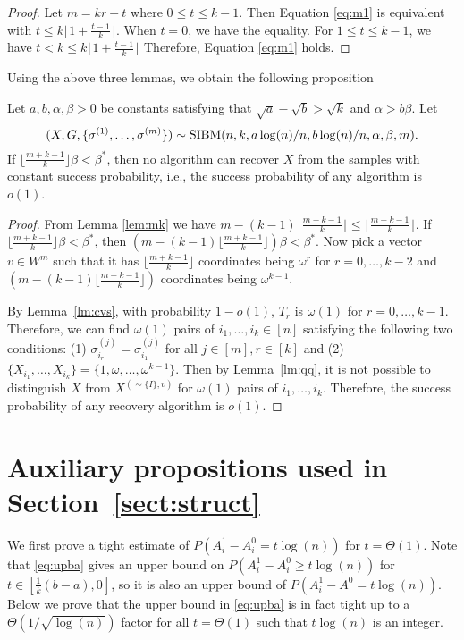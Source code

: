 \documentclass{article}
\begin{document}
\begin{proof}
   Let $m = kr + t$ where $0\leq t \leq k-1$.
   Then Equation \eqref{eq:m1} is equivalent with $ t \leq k\lfloor 1 +  \frac{t-1}{k} \rfloor $.
   When $ t = 0$, we have the equality. For $1\leq t \leq k-1$, we have $t < k \leq k\lfloor 1 +  \frac{t-1}{k} \rfloor$
   Therefore, Equation \eqref{eq:m1} holds.
\end{proof}
Using the above three lemmas, we obtain the following proposition
\begin{proposition}
	Let $a,b,\alpha,\beta> 0$ be constants satisfying that $\sqrt{a}-\sqrt{b} > \sqrt{k}$ and $\alpha>b\beta$. 
	Let 
	$$
	(X,G,\{\sigma^{(1)},\dots,\sigma^{(m)}\})\sim \operatorname{SIBM}(n,k,a\log(n)/n, b\log(n)/n,\alpha,\beta, m) .
	$$
	If $\lfloor\frac{m+k-1}{k} \rfloor \beta<\beta^\ast$, then no algorithm can recover $X$ from the samples with constant success probability, i.e., the success probability of any algorithm is $o(1)$.
\end{proposition}
\begin{proof}
	From Lemma \ref{lem:mk} we have $m-(k-1)\lfloor \frac{m+k-1}{k}  \rfloor \le \lfloor \frac{m+k-1}{k}  \rfloor$. If $\lfloor \frac{m+k-1}{k}  \rfloor\beta<\beta^\ast$, then $(m-(k-1)\lfloor \frac{m+k-1}{k}  \rfloor) \beta<\beta^\ast$.
	Now pick a vector $v\in W^m$ such that it has $\lfloor \frac{m+k-1}{k} \rfloor$ coordinates being $\omega^r$ for $r=0, \dots, k-2$
	and $(m-(k-1)\lfloor \frac{m+k-1}{k}  \rfloor)$ coordinates being $\omega^{k-1}$.
	
	By Lemma~\ref{lm:cvs}, with probability $1-o(1)$, $T_r$ is $\omega(1)$ for $r=0, \dots, k-1$. Therefore, we can find $\omega(1)$ pairs of $i_1, \dots, i_k \in[n]$ satisfying the following two conditions: (1) $\sigma_{i_r}^{(j)}=\sigma_{i_1}^{(j)}$ for all $j\in[m], r\in[k]$ and (2) $\{X_{i_1}, \dots, X_{i_k} \} = \{1, \omega, \dots, \omega^{k-1} \}$. Then by Lemma~\ref{lm:qq}, it is not possible to distinguish $X$ from $X^{(\sim\{I\}, v)}$ for $\omega(1)$ pairs of $i_1, \dots,i_k$. Therefore, the success probability of any recovery algorithm is $o(1)$.
\end{proof}
\appendix

\section{Auxiliary propositions used in Section~\ref{sect:struct}}\label{ap:um}



We first prove a tight estimate of $P(A^1_i-A^0_i = t\log(n))$ for $t=\Theta(1)$. Note that \eqref{eq:upba} gives an upper bound on $P(A^1_i-A^0_i \ge t\log(n))$ for $t\in [\frac{1}{k}(b-a), 0]$, so it is also an upper bound of $P(A^1_i-A^0 = t\log(n))$. Below we prove that the upper bound in \eqref{eq:upba} is in fact tight up to a $\Theta(1/ \sqrt{\log(n)})$ factor for all $t=\Theta(1)$ such that $t\log(n)$ is an integer.
\end{document}
